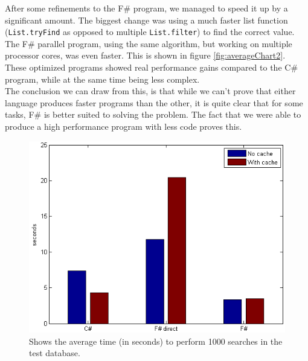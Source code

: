\documentclass[12pt, a4paper]{article}
\newcommand{\code}[1]{{\small \texttt{#1}}}
\begin{document}
After some refinements to the F\# program, we managed to speed it up by a significant amount. The biggest change was using a much faster list function (\code{List.tryFind} as opposed to multiple \code{List.filter}) to find the correct value. The F\# parallel program, using the same algorithm, but working on multiple processor cores, was even faster. This is shown in figure \ref{fig:averageChart2}. These optimized programs showed real performance gains compared to the C\# program, while at the same time being less complex.\\

The conclusion we can draw from this, is that while we can't prove that either language produces faster programs than the other, it is quite clear that for some tasks, F\# is better suited to solving the problem. The fact that we were able to produce a high performance program with less code proves this.

\begin{figure}[!h]
    \includegraphics[scale=0.8]{averageChart1}
    \centering
    \caption{Shows the average time (in seconds) to perform 1000 searches in the test database.}
\label{fig:averageChart1}
\end{figure}
\end{document}
